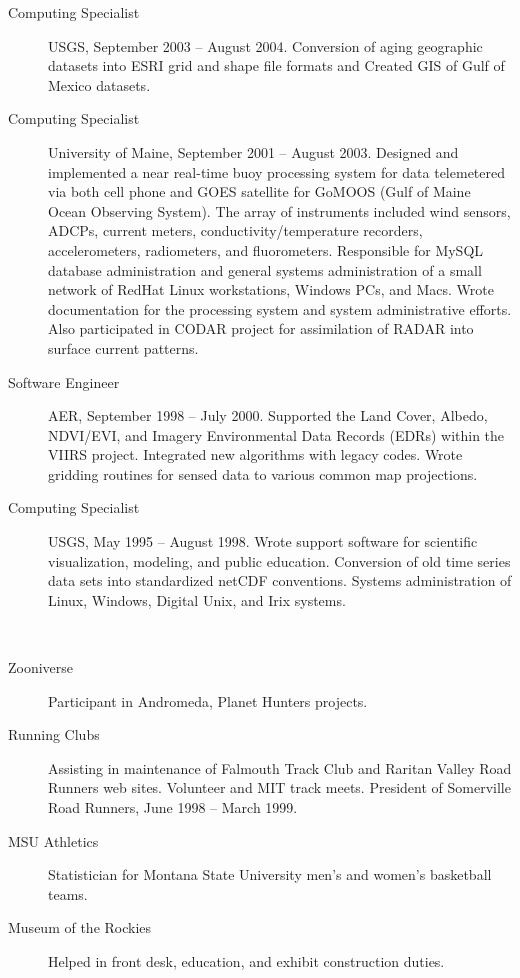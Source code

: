 \documentclass[11pt]{article}  %
\begin{document}
\begin{description}
  \item[Computing Specialist] USGS, September 2003 -- August 2004.  
    Conversion of aging geographic datasets into ESRI grid and shape
    file formats and Created GIS of Gulf of Mexico datasets.
  \item[Computing Specialist] University of Maine, September 2001 -- August
    2003.  Designed and implemented a near real-time buoy processing
    system for data telemetered via both cell phone and GOES satellite
    for GoMOOS (Gulf of Maine Ocean Observing System).   The array
    of instruments included wind sensors, ADCPs, current meters,
    conductivity/temperature recorders, accelerometers, radiometers,
    and fluorometers.   Responsible for MySQL database administration
    and general systems administration of a small network of RedHat
    Linux workstations, Windows PCs, and Macs.   Wrote documentation
    for the processing system and system administrative efforts.
    Also participated in CODAR project for assimilation of RADAR into
    surface current patterns.
  \item[Software Engineer] AER, September 1998 -- July 2000.  Supported the
    Land Cover, Albedo, NDVI/EVI, and Imagery Environmental Data Records
    (EDRs) within the VIIRS project. Integrated new algorithms with
    legacy codes. Wrote gridding routines for sensed data to various
    common map projections.
  \item[Computing Specialist] USGS, May 1995 -- August 1998.  
    Wrote support software for scientific visualization, modeling, and
    public education. Conversion of old time series data sets into
    standardized netCDF conventions.  Systems administration of Linux,
    Windows, Digital Unix, and Irix systems.
\end{description}

\bigskip 
{}\\ 
\begin{description}
  \item[Zooniverse] Participant in Andromeda, Planet Hunters projects.
  \item[Running Clubs] Assisting in maintenance of Falmouth Track Club and
    Raritan Valley Road Runners web sites.  Volunteer and MIT track meets.
    President of Somerville Road Runners, June 1998 -- March 1999.
  \item[MSU Athletics] Statistician for Montana State University men's and
    women's basketball teams.
  \item[Museum of the Rockies] Helped in front desk, education, and exhibit
    construction duties.
\end{description}
\end{document}

